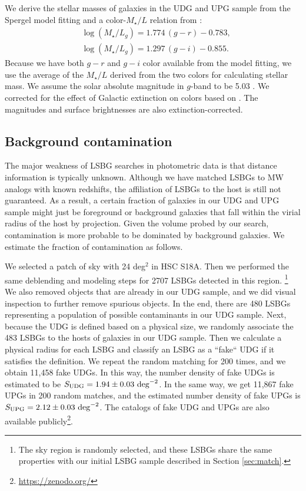 \documentclass[twocolumn,astrosymb,twocolappendix]{aastex631}
\begin{document}
\begin{CJK*}{UTF8}{gbsn}
We derive the stellar masses of galaxies in the UDG and UPG sample from the Spergel model fitting and a color-$M_{\star}/L$ relation from \citet{Into2013}:
\begin{align*}
&\log \left(M_{\star} / L_{g}\right)=1.774\,(g-r)-0.783, \\
&\log \left(M_{\star} / L_{g}\right)=1.297\,(g-i)-0.855.
\end{align*}
Because we have both $g-r$ and $g-i$ color available from the model fitting, we use the average of the $M_{\star}/L$ derived from the two colors for calculating stellar mass. We assume the solar absolute magnitude in $g$-band to be 5.03 \citep{Willmer2018}. We corrected for the effect of Galactic extinction on colors based on \citet{SFD1998,Schlafly2011}. The magnitudes and surface brightnesses are also extinction-corrected. 


\subsection{Background contamination}\label{sec:bkg}
The major weakness of LSBG searches in photometric data is that distance information is typically unknown. Although we have matched LSBGs to MW analogs with known redshifts, the affiliation of LSBGs to the host is still not guaranteed. As a result, a certain fraction of galaxies in our UDG and UPG sample might just be foreground or background galaxies that fall within the virial radius of the host by projection. Given the volume probed by our search, contamination is more probable to be dominated by background galaxies. We estimate the fraction of contamination as follows.

We selected a patch of sky with 24 deg$^{2}$ in HSC S18A. Then we performed the same deblending and modeling steps for 2707 LSBGs detected in this region. \footnote{The sky region is randomly selected, and these LSBGs share the same properties with our initial LSBG sample described in Section \ref{sec:match}.} We also removed objects that are already in our UDG sample, and we did visual inspection to further remove spurious objects. In the end, there are 480 LSBGs representing a population of possible contaminants in our UDG sample. Next, because the UDG is defined based on a physical size, we randomly associate the 483 LSBGs to the hosts of galaxies in our UDG sample. Then we calculate a physical radius for each LSBG and classify an LSBG as a ``fake`` UDG if it satisfies the definition. We repeat the random matching for 200 times, and we obtain 11,458 fake UDGs. In this way, the number density of fake UDGs is estimated to be $S_{\rm UDG} = 1.94\pm0.03\ \mathrm{deg}^{-2}$. In the same way, we get 11,867 fake UPGs in 200 random matches, and the estimated number density of fake UPGs is $S_{\rm UPG} = 2.12\pm0.03\ \mathrm{deg}^{-2}$. The catalogs of fake UDG and UPGs are also available publicly\footnote{\url{https://zenodo.org/}}.


\end{CJK*}
\end{document}
